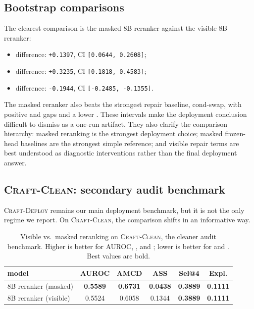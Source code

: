 \subsection{Bootstrap comparisons}

The clearest comparison is the masked 8B reranker against the visible 8B
reranker:
\begin{itemize}[leftmargin=1.5em]
\item \auroc{} difference: \texttt{+0.1397}, CI \texttt{[0.0644, 0.2608]};
\item \amcd{} difference: \texttt{+0.3235}, CI \texttt{[0.1818, 0.4583]};
\item \asstotal{} difference: \texttt{-0.1944}, CI
\texttt{[-0.2485, -0.1355]}.
\end{itemize}
The masked reranker also beats the strongest repair baseline, cond-swap, with
positive \auroc{} and \amcd{} gaps and a lower \asstotal. These intervals make
the deployment conclusion difficult to dismiss as a one-run artifact. They
also clarify the comparison hierarchy: masked reranking is the strongest
deployment choice; masked frozen-head baselines are the strongest simple
reference; and visible repair terms are best understood as diagnostic
interventions rather than the final deployment answer.

\subsection{\textsc{Craft-Clean}: secondary audit benchmark}

\textsc{Craft-Deploy} remains our main deployment benchmark, but it is not the
only regime we report. On \textsc{Craft-Clean}, the comparison shifts in an
informative way.

\begin{table}[t]
\centering
\caption{Visible vs.\ masked reranking on \textsc{Craft-Clean}, the cleaner
audit benchmark. Higher is better for AUROC, \amcd, and
\selectiongain; lower is better for \asstotal{} and \exploitability. Best
values are bold.}
\label{tab:benchv3}
\small
\begin{tabular}{lccccc}
\toprule
model & AUROC & AMCD & ASS & Sel@4 & Expl. \\
\midrule
8B reranker (masked) & \textbf{0.5589} & \textbf{0.6731} & \textbf{0.0438} & \textbf{0.3889} & \textbf{0.1111} \\
8B reranker (visible) & 0.5524 & 0.6058 & 0.1344 & \textbf{0.3889} & \textbf{0.1111} \\
\bottomrule
\end{tabular}
\end{table}

